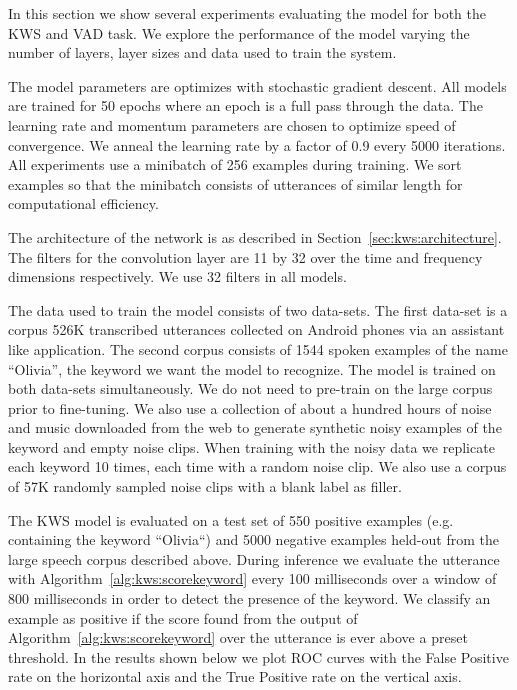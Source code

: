 In this section we show several experiments evaluating the model for both the
KWS and VAD task. We explore the performance of the model varying the number of
layers, layer sizes and data used to train the system.

The model parameters are optimizes with stochastic gradient descent. All models
are trained for 50 epochs where an epoch is a full pass through the data. The
learning rate and momentum parameters are chosen to optimize speed of
convergence. We anneal the learning rate by a factor of 0.9 every 5000
iterations. All experiments use a minibatch of 256 examples during training. We
sort examples so that the minibatch consists of utterances of similar length
for computational efficiency. 

The architecture of the network is as described in
Section~\ref{sec:kws:architecture}. The filters for the convolution layer are
11 by 32 over the time and frequency dimensions respectively. We use 32 filters
in all models.

The data used to train the model consists of two data-sets. The first data-set
is a corpus 526K transcribed utterances collected on Android phones via an
assistant like application. The second corpus consists of 1544 spoken examples
of the name ``Olivia'', the keyword we want the model to recognize. The model
is trained on both data-sets simultaneously. We do not need to pre-train on the
large corpus prior to fine-tuning. We also use a collection of about a hundred
hours of noise and music downloaded from the web to generate synthetic noisy
examples of the keyword and empty noise clips. When training with the noisy
data we replicate each keyword 10 times, each time with a random noise clip. We
also use a corpus of 57K randomly sampled noise clips with a blank label as
filler.

The KWS model is evaluated on a test set of 550 positive examples (e.g.
containing the keyword ``Olivia``) and 5000 negative examples held-out from the
large speech corpus described above. During inference we evaluate the utterance
with Algorithm~\ref{alg:kws:scorekeyword} every 100 milliseconds over a window
of 800 milliseconds in order to detect the presence of the keyword. We classify
an example as positive if the score found from the output of
Algorithm~\ref{alg:kws:scorekeyword} over the utterance is ever above a preset
threshold.  In the results shown below we plot ROC curves with the False
Positive rate on the horizontal axis and the True Positive rate on the vertical
axis.

